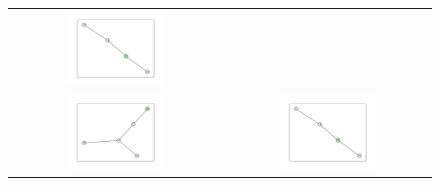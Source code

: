 \documentclass[12pt, a4paper]{extarticle}
\begin{document}
\begin{figure}
\begin{tabularx}{\textwidth}{cc}
\includegraphics[width=0.5\textwidth]{task11-graphlets/4_18-19-23-24.pdf} \\
\includegraphics[width=0.5\textwidth]{task11-graphlets/5_14-16-13-21-23.pdf} &
\includegraphics[width=0.5\textwidth]{task11-graphlets/4_18-25-22-23.pdf} \\
\end{tabularx}\end{figure}
\end{document}

